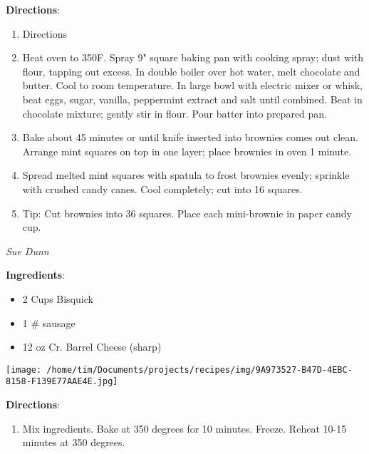 \documentclass[11pt, twoside, openany]{book}
\begin{document}
\textbf{Directions}:
\vspace{-3mm}\begin{enumerate}\setlength\itemsep{-1mm}
\item Directions
\item Heat oven to 350F. Spray 9" square baking pan with cooking spray; dust with flour, tapping out excess. In double boiler over hot water, melt chocolate and butter. Cool to room temperature. In large bowl with electric mixer or whisk, beat eggs, sugar, vanilla, peppermint extract and salt until combined. Beat in chocolate mixture; gently stir in flour. Pour batter into prepared pan.
\item Bake about 45 minutes or until knife inserted into brownies comes out clean. Arrange mint squares on top in one layer; place brownies in oven 1 minute.
\item Spread melted mint squares with spatula to frost brownies evenly; sprinkle with crushed candy canes. Cool completely; cut into 16 squares.
\item Tip: Cut brownies into 36 squares. Place each mini-brownie in paper candy cup.
\end{enumerate}
 \label{sausage-balls}\hfill\textit{Sue Dunn}\\
\begin{minipage}[t]{0.8\linewidth}
\textbf{Ingredients}:\vspace{-3mm}
\begin{multicols}{2}
\begin{itemize}\setlength\itemsep{-1mm}
\item 2 Cups Bisquick
\item 1 # sausage
\item 12 oz Cr. Barrel Cheese (sharp)
\end{itemize}
\end{multicols}
\end{minipage}
\begin{minipage}[t]{0.2\linewidth}
\centering \strut\vspace*{-\baselineskip}\newline
\texttt{[image: /home/tim/Documents/projects/recipes/img/9A973527-B47D-4EBC-8158-F139E77AAE4E.jpg]}\\
\end{minipage}\vspace{3mm}
\textbf{Directions}:
\vspace{-3mm}\begin{enumerate}\setlength\itemsep{-1mm}
\item Mix ingredients. Bake at 350 degrees for 10 minutes. Freeze. Reheat 10-15 minutes at 350 degrees.
\end{enumerate}
\end{document}
